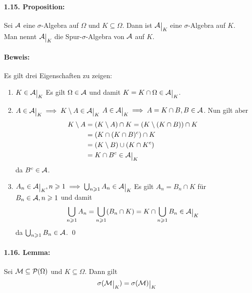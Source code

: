 \paragraph{1.15. Proposition:} Sei $\mathcal{A}$ eine $\sigma$-Algebra auf $\Omega$ und $K\subseteq\Omega$. Dann ist $\A\krestr{K}$ eine $\sigma$-Algebra auf $K$. Man nennt $\A\krestr{K}$ die Spur-$\sigma$-Algebra von $\mathcal{A}$ auf $K$. 

\paragraph{Beweis:}Es gilt drei Eigenschaften zu zeigen:
\begin{enumerate}[label=(\roman*)]
    \item $K\in\A\krestr{K}$\newline
    Es gilt $\Omega\in\mathcal{A}$ und damit $K=K\cap\Omega\in \A\krestr{K}$.
    \item $A\in\A\krestr{K}\implies K\setminus A\in\A\krestr{K}$\newline
    $A\in\A\krestr{K}\implies A=K\cap B,B\in\A$. Nun gilt aber 
    \begin{align*}
        K\setminus A&=(K\setminus A)\cap K=(K\setminus(K\cap B))\cap K\\
        &=(K\cap(K\cap B)^c)\cap K\\
        &=(K\setminus B)\cup(K\cap K^c)\\
        &=K\cap B^c\in \A\krestr{K}
    \end{align*}
    da $B^c\in\mathcal{A}$.
    \item $A_n\in\A\krestr{K},n\geq1\implies\bigcup_{n\geq1}A_n\in\A\krestr{K}$\newline
    Es gilt $A_n=B_n\cap K$ f\"ur $B_n\in\mathcal{A}, n\geqslant1$ und damit
    $$\bigcup_{n\geq1}A_n=\bigcup_{n\geq1}(B_n\cap K)=K\cap\bigcup_{n\geq1}B_n\in\A\krestr{K}$$
    da $\bigcup_{n\geqslant1}B_n\in\mathcal{A}$. \qed
\end{enumerate}

\paragraph{1.16. Lemma:}Sei $\mathcal{M}\subseteq\mathcal{P}(\Omega)$ und $K\subseteq\Omega$. Dann gilt 
$$\sigma(\M\krestr{K})=\sigma(\M)\krestr{K}$$

